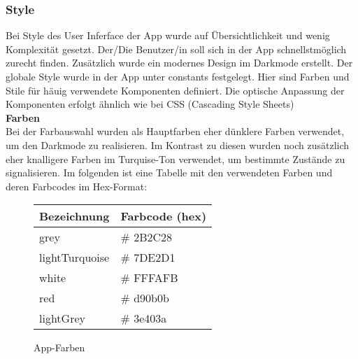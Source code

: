 \documentclass[]{article}
\begin{document}
\subsubsection{Style}
Bei Style des User Inferface der App wurde auf Übersichtlichkeit und wenig Komplexität gesetzt. Der/Die Benutzer/in soll sich in der App schnellstmöglich zurecht finden. Zusätzlich wurde ein modernes Design im Darkmode erstellt. Der globale Style wurde in der App unter constants festgelegt. Hier sind Farben und Stile für häuig verwendete Komponenten definiert. Die optische Anpassung der Komponenten erfolgt ähnlich wie bei CSS (Cascading Style Sheets) \newline \\
\textbf{Farben} \\
Bei der Farbauswahl wurden als Hauptfarben eher dünklere Farben verwendet, um den Darkmode zu realisieren. Im Kontrast zu diesen wurden noch zusätzlich eher knalligere Farben im Turquise-Ton verwendet, um
bestimmte Zustände zu signalisieren. Im folgenden ist eine Tabelle mit den verwendeten Farben und deren Farbcodes im Hex-Format: \\
\begin{figure}[H]
\begin{tabular}{|l|l|}
\hline
\textbf{Bezeichnung} & \textbf{Farbcode (hex)} \\
\hline
grey & \# 2B2C28 \\
\hline 
lightTurquoise & \# 7DE2D1 \\
\hline 
white & \# FFFAFB \\
\hline 
red & \# d90b0b \\
\hline 
lightGrey & \# 3e403a \\
\hline 
\end{tabular} 
\caption{App-Farben}
\end{figure}
\end{document}
